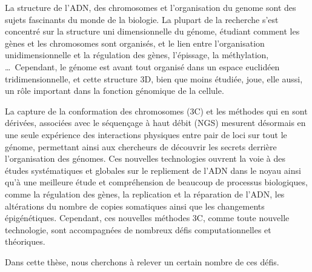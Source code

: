 \begin{resumes}

La structure de l'ADN, des chromosomes et l'organisation du genome sont des
sujets fascinants du monde de la biologie. La plupart de la recherche s'est
concentré sur la structure uni dimensionnelle du génome, étudiant comment les
gènes et les chromosomes sont organisés, et le lien entre l'organisation
unidimensionnelle et la régulation des gènes, l'épissage, la méthylation,
\dots \ Cependant, le génome est avant tout organisé dans un espace euclidéen
tridimensionnelle, et cette structure 3D, bien que moins étudiée, joue, elle
aussi, un rôle important dans la fonction génomique de la cellule.

La capture de la conformation des chromosomes (3C) et les méthodes qui en sont
dérivées, associées avec le séquençage à haut débit (NGS) mesurent désormais
en une seule expérience des interactions physiques entre pair de
loci sur tout le génome, permettant ainsi aux chercheurs de découvrir les
secrets derrière l'organisation des génomes. Ces nouvelles technologies
ouvrent la voie à des études systématiques et globales sur le repliement de
l'ADN dans le noyau ainsi qu'à une meilleure étude et compréhension de
beaucoup de processus biologiques, comme la régulation des gènes, la replication
et la réparation de l'ADN, les altérations du nombre de copies somatiques ainsi
que les changements épigénétiques. Cependant, ces nouvelles méthodes 3C, comme
toute nouvelle technologie, sont accompagnées de nombreux défis
computationnelles et théoriques.

Dans cette thèse, nous cherchons à relever un certain nombre de ces défis.


\end{resumes}
